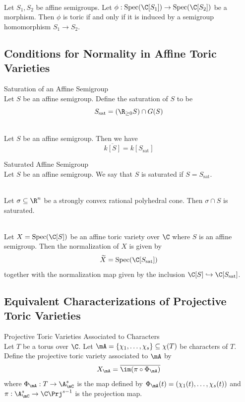 \documentclass[a4paper]{article}
\begin{document}
\begin{prp}{}{}\\
Let $S_1,S_2$ be affine semigroups. Let $\phi:\text{Spec}(\C[S_1])\to\text{Spec}(\C[S_2])$ be a morphism. Then $\phi$ is toric if and only if it is induced by a semigroup homomorphism $S_1\to S_2$. 
\end{prp}

\subsection{Conditions for Normality in Affine Toric Varieties}
\begin{defn}{Saturation of an Affine Semigroup}{}\\
Let $S$ be an affine semigroup. Define the saturation of $S$ to be $$S_\text{sat}=(\R_{\geq 0}S)\cap G(S)$$
\end{defn}

\begin{prp}{}{}\\
Let $S$ be an affine semigroup. Then we have $$\overline{k[S]}=k[S_\text{sat}]$$
\end{prp}

\begin{defn}{Saturated Affine Semigroup}{}\\
Let $S$ be an affine semigroup. We say that $S$ is saturated if $S=S_\text{sat}$. 
\end{defn}

\begin{lmm}{}{}\\
Let $\sigma\subseteq\R^n$ be a strongly convex rational polyhedral cone. Then $\sigma\cap S$ is saturated. 
\end{lmm}

\begin{lmm}{}{}\\
Let $X=\text{Spec}(\C[S])$ be an affine toric variety over $\C$ where $S$ is an affine semigroup. Then the normalization of $X$ is given by $$\widetilde{X}=\text{Spec}(\C[S_{\text{sat}}])$$ together with the normalization map given by the inclusion $\C[S]\hookrightarrow\C[S_{\text{sat}}]$. 
\end{lmm}

\subsection{Equivalent Characterizations of Projective Toric Varieties}
\begin{defn}{Projective Toric Varieties Associated to Characters}{}\\
Let $T$ be a torus over $\C$. Let $\mA=\{\chi_1,\dots,\chi_s\}\subseteq\chi(T)$ be characters of $T$. Define the projective toric variety associated to $\mA$ by $$X_\mA=\overline{\im(\pi\circ\Phi_\mA)}$$ where $\Phi_\mA:T\to\A_\mC^s$ is the map defined by $\Phi_\mA(t)=(\chi_1(t),\dots,\chi_s(t))$ and $\pi:\A_\mC^s\to\C\Prj^{s-1}$ is the projection map. 
\end{defn}
\end{document}

